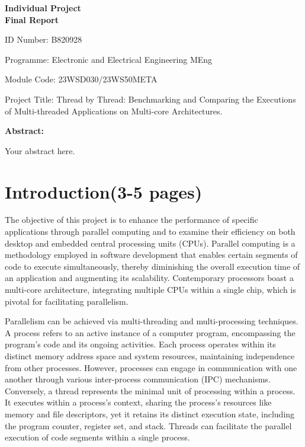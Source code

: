 \documentclass[12pt, openany]{book}
\begin{document}
\begin{titlepage}
	\centering
	\vspace*{1cm} %
	{\Huge\bfseries Individual Project\\[0.5cm] Final Report\par}
	
	\raggedright
	ID Number: B820928\par
	
	Programme: Electronic and Electrical Engineering MEng\par
	
	Module Code: 23WSD030/23WS50META\par
	
	Project Title: Thread by Thread: Benchmarking and Comparing the Executions of Multi-threaded Applications on Multi-core Architectures.\par
	
	\textbf{Abstract:}\par %
	Your abstract here.
	
\end{titlepage}


\newpage
\tableofcontents

\chapter{Introduction(3-5 pages)}
The objective of this project is to enhance the performance of specific applications through parallel computing and to examine their efficiency on both desktop and embedded central processing units (CPUs). Parallel computing is a methodology employed in software development that enables certain segments of code to execute simultaneously, thereby diminishing the overall execution time of an application and augmenting its scalability. Contemporary processors boast a multi-core architecture, integrating multiple CPUs within a single chip, which is pivotal for facilitating parallelism.  

Parallelism can be achieved via multi-threading and multi-processing techniques. A process refers to an active instance of a computer program, encompassing the program's code and its ongoing activities. Each process operates within its distinct memory address space and system resources, maintaining independence from other processes. However, processes can engage in communication with one another through various inter-process communication (IPC) mechanisms. Conversely, a thread represents the minimal unit of processing within a process. It executes within a process's context, sharing the process’s resources like memory and file descriptors, yet it retains its distinct execution state, including the program counter, register set, and stack. Threads can facilitate the parallel execution of code segments within a single process. 
\end{document}
